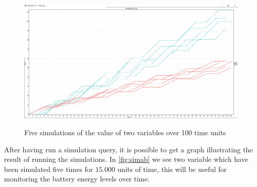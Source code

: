 \begin{figure}[!h]
	\includegraphics[width=\textwidth]{graphics/showcase02.png}
	\label{fig:sim02}
	\caption{Five simulations of the value of two variables  over 100 time units}
\end{figure}




After having run a simulation query, it is possible to get a graph illustrating the result of running the simulations. In \cref{fig:simab} we see two variable which have been simulated five times for $15.000$ units of time, this will be useful for monitoring the battery energy levels over time.


